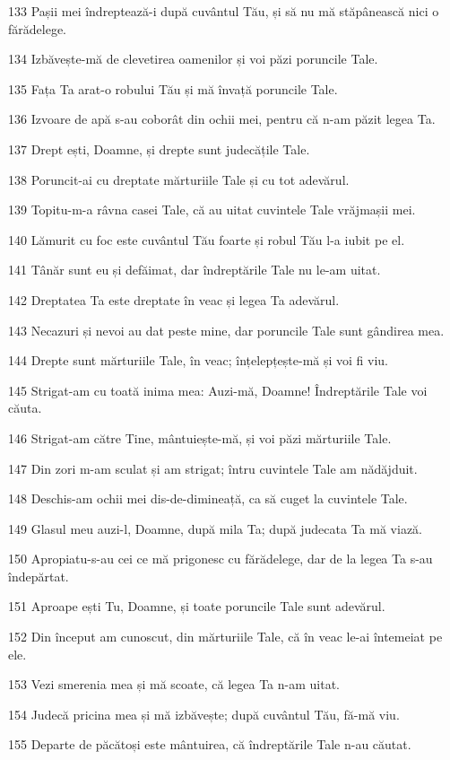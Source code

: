 \par 133 Pașii mei îndreptează-i după cuvântul Tău, și să nu mă stăpânească nici o fărădelege.
\par 134 Izbăvește-mă de clevetirea oamenilor și voi păzi poruncile Tale.
\par 135 Fața Ta arat-o robului Tău și mă învață poruncile Tale.
\par 136 Izvoare de apă s-au coborât din ochii mei, pentru că n-am păzit legea Ta.
\par 137 Drept ești, Doamne, și drepte sunt judecățile Tale.
\par 138 Poruncit-ai cu dreptate mărturiile Tale și cu tot adevărul.
\par 139 Topitu-m-a râvna casei Tale, că au uitat cuvintele Tale vrăjmașii mei.
\par 140 Lămurit cu foc este cuvântul Tău foarte și robul Tău l-a iubit pe el.
\par 141 Tânăr sunt eu și defăimat, dar îndreptările Tale nu le-am uitat.
\par 142 Dreptatea Ta este dreptate în veac și legea Ta adevărul.
\par 143 Necazuri și nevoi au dat peste mine, dar poruncile Tale sunt gândirea mea.
\par 144 Drepte sunt mărturiile Tale, în veac; înțelepțește-mă și voi fi viu.
\par 145 Strigat-am cu toată inima mea: Auzi-mă, Doamne! Îndreptările Tale voi căuta.
\par 146 Strigat-am către Tine, mântuiește-mă, și voi păzi mărturiile Tale.
\par 147 Din zori m-am sculat și am strigat; întru cuvintele Tale am nădăjduit.
\par 148 Deschis-am ochii mei dis-de-dimineață, ca să cuget la cuvintele Tale.
\par 149 Glasul meu auzi-l, Doamne, după mila Ta; după judecata Ta mă viază.
\par 150 Apropiatu-s-au cei ce mă prigonesc cu fărădelege, dar de la legea Ta s-au îndepărtat.
\par 151 Aproape ești Tu, Doamne, și toate poruncile Tale sunt adevărul.
\par 152 Din început am cunoscut, din mărturiile Tale, că în veac le-ai întemeiat pe ele.
\par 153 Vezi smerenia mea și mă scoate, că legea Ta n-am uitat.
\par 154 Judecă pricina mea și mă izbăvește; după cuvântul Tău, fă-mă viu.
\par 155 Departe de păcătoși este mântuirea, că îndreptările Tale n-au căutat.
